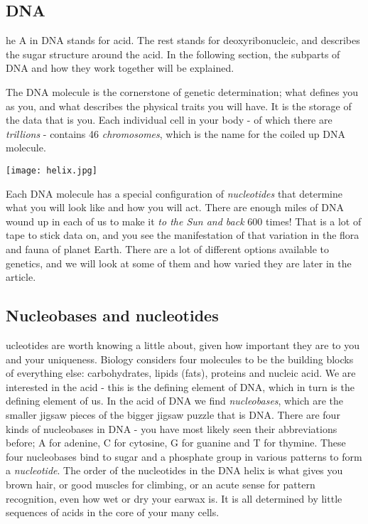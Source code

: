 \subsection{DNA}
he A in DNA stands for acid.
The rest stands for deoxyribonucleic, and describes the sugar structure around the acid.
In the following section, the subparts of DNA and how they work together will be explained.

The DNA molecule is the cornerstone of genetic determination; what defines you as you, and what describes the physical traits you will have.
It is the storage of the data that is you.
Each individual cell in your body - of which there are \emph{trillions} - contains 46 \emph{chromosomes}, which is the name for the coiled up DNA molecule.

\begin{center}
	\texttt{[image: helix.jpg]}
\end{center}

Each DNA molecule has a special configuration of \emph{nucleotides} that determine what you will look like and how you will act.\cite{pearson}
There are enough miles of DNA wound up in each of us to make it \emph{to the Sun and back} 600 times!
That is a lot of tape to stick data on, and you see the manifestation of that variation in the flora and fauna of planet Earth.
There are a lot of different options available to genetics, and we will look at some of them and how varied they are later in the article.

\subsection{Nucleobases and nucleotides}
ucleotides are worth knowing a little about, given how important they are to you and your uniqueness.
Biology considers four molecules to be the building blocks of everything else: carbohydrates, lipids (fats), proteins and nucleic acid.
We are interested in the acid - this is the defining element of DNA, which in turn is the defining element of us.
In the acid of DNA we find \emph{nucleobases}, which are the smaller jigsaw pieces of the bigger jigsaw puzzle that is DNA.
There are four kinds of nucleobases in DNA - you have most likely seen their abbreviations before; A for adenine, C for cytosine, G for guanine and T for thymine.\cite{hankgreen}
These four nucleobases bind to sugar and a phosphate group in various patterns to form a \emph{nucleotide}.
The order of the nucleotides in the DNA helix is what gives you brown hair, or good muscles for climbing, or an acute sense for pattern recognition, even how wet or dry your earwax is.\cite{hankgreen}
It is all determined by little sequences of acids in the core of your many cells.


